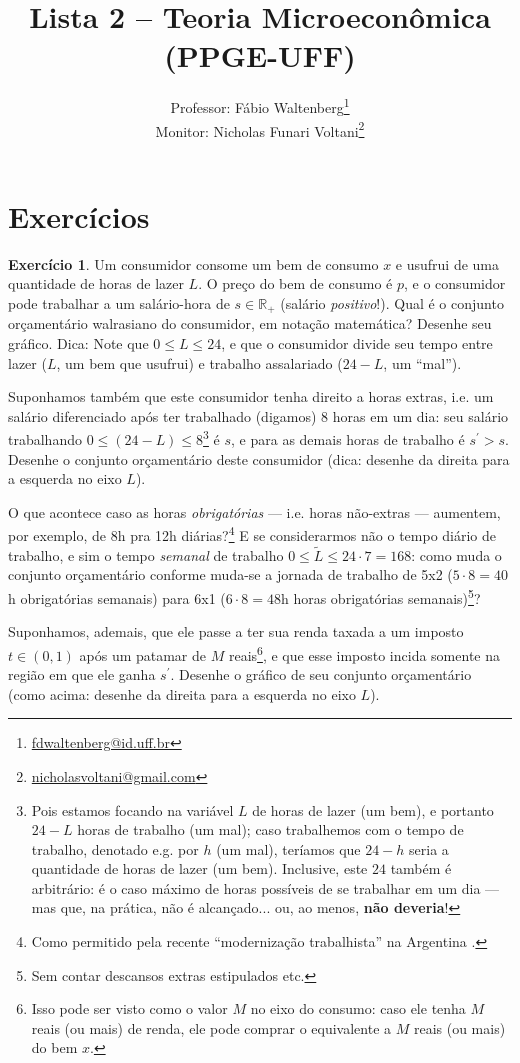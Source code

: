 \documentclass[12pt]{article}
\title{Lista 2 -- Teoria Microeconômica (PPGE-UFF)}
\author{Professor: Fábio Waltenberg\thanks{\href{mailto:fdwaltenberg@id.uff.br}{fdwaltenberg@id.uff.br}} \\Monitor: Nicholas Funari Voltani\thanks{\href{mailto:nicholasvoltani@gmail.com}{nicholasvoltani@gmail.com}}}
\date{}
\numberwithin{equation}{section}
\theoremstyle{plain}
\theoremstyle{definition}
\newtheorem{exercise}{Exercício}
\theoremstyle{remark}
\begin{document}
\maketitle


\hypertarget{exercuxedcios}{%
\section{Exercícios}\label{exercuxedcios}}

\begin{exercise}
    Um consumidor consome um bem de consumo \(x\) e
    usufrui de uma quantidade de horas de lazer \(L\). O preço do bem de
    consumo é \(p\), e o consumidor pode trabalhar a um salário-hora de
    \(s \in \mathbb{R}_+\) (salário \emph{positivo}!). Qual é o conjunto
    orçamentário walrasiano do consumidor, em notação matemática? Desenhe seu gráfico. Dica: Note que \(0 \leq L \leq 24\), e que o consumidor divide seu tempo entre lazer ($L$, um bem que usufrui) e trabalho assalariado ($24-L$, um ``mal'').

    \parencite{Mas-Colell1995} Suponhamos também que este consumidor tenha direito a horas extras, i.e. um salário diferenciado após ter trabalhado (digamos) 8 horas em um dia: seu salário trabalhando $0\leq (24-L) \leq 8$\footnote{Pois estamos focando na variável $L$ de horas de lazer (um bem), e portanto $24-L$ horas de trabalho (um mal); caso trabalhemos com o tempo de trabalho, denotado e.g. por $h$ (um mal), teríamos que $24-h$ seria a quantidade de horas de lazer (um bem). Inclusive, este $24$ também é arbitrário: é o caso máximo de horas possíveis de se trabalhar em um dia --- mas que, na prática, não é alcançado... ou, ao menos, \textbf{não deveria}!} é $s$, e para as demais horas de trabalho é $s^{\prime}  > s$. Desenhe o conjunto orçamentário deste consumidor (dica: desenhe da direita para a esquerda no eixo $L$). 
    
    O que acontece caso as horas \textit{obrigatórias} --- i.e. horas não-extras --- aumentem, por exemplo, de 8h pra 12h diárias?\footnote{Como permitido pela recente ``modernização trabalhista'' na Argentina \parencite{BBCNews2026}.} E se considerarmos não o tempo diário de trabalho, e sim o tempo \textit{semanal} de trabalho $0\leq  \tilde{L}\leq 24 \cdot 7=168$: como muda o conjunto orçamentário conforme muda-se a jornada de trabalho de 5x2 ($5\cdot 8 = 40$h obrigatórias semanais) para 6x1 ($6\cdot 8 = 48$h horas obrigatórias semanais)\footnote{Sem contar descansos extras estipulados etc.}?

    Suponhamos, ademais, que ele passe a ter sua renda taxada a um imposto $t \in (0, 1)$ após um patamar de $M$ reais\footnote{Isso pode ser visto como o valor $M$ no eixo do consumo: caso ele tenha $M$ reais (ou mais) de renda, ele pode comprar o equivalente a $M$ reais (ou mais) do bem $x$.}, e que esse imposto incida somente na região em que ele ganha $s^{\prime}$. Desenhe o gráfico de seu conjunto orçamentário (como acima: desenhe da direita para a esquerda no eixo $L$).
\end{exercise}
\end{document}
